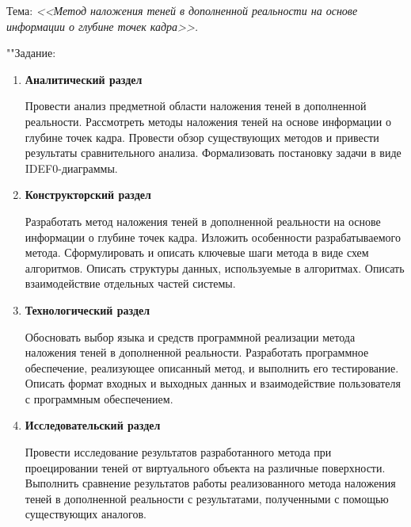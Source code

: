 \documentclass[a4paper]{bmstu}
\begin{document}
	\noindent Тема: \textit{<<Метод наложения теней в дополненной реальности на основе информации о глубине точек кадра>>.}
	
	""\newline\noindent Задание:
	
	\begin{enumerate}
		\item \textbf{Аналитический раздел}
		
		Провести анализ предметной области наложения теней в дополненной реальности. Рассмотреть методы наложения теней на основе информации о глубине точек кадра. Провести обзор существующих методов и привести результаты сравнительного анализа. Формализовать постановку задачи в виде IDEF0-диаграммы.
		
		\item \textbf{Конструкторский раздел}
		
		Разработать метод наложения теней в дополненной реальности на основе информации о глубине точек кадра. Изложить особенности разрабатываемого метода. Сформулировать и описать ключевые шаги метода в виде схем алгоритмов. Описать структуры данных, используемые в алгоритмах. Описать взаимодействие отдельных частей системы.
		
		\item \textbf{Технологический раздел}
		
		Обосновать выбор языка и средств программной реализации метода наложения теней в дополненной реальности. Разработать программное обеспечение, реализующее описанный метод, и выполнить его тестирование. Описать формат входных и выходных данных и взаимодействие пользователя с программным обеспечением.
		
		\item \textbf{Исследовательский раздел}
		
		Провести исследование результатов разработанного метода при проецировании теней от виртуального объекта на различные поверхности. Выполнить сравнение результатов работы реализованного метода наложения теней в дополненной реальности с результатами, полученными с помощью существующих аналогов.
		
	\end{enumerate}
\end{document}
